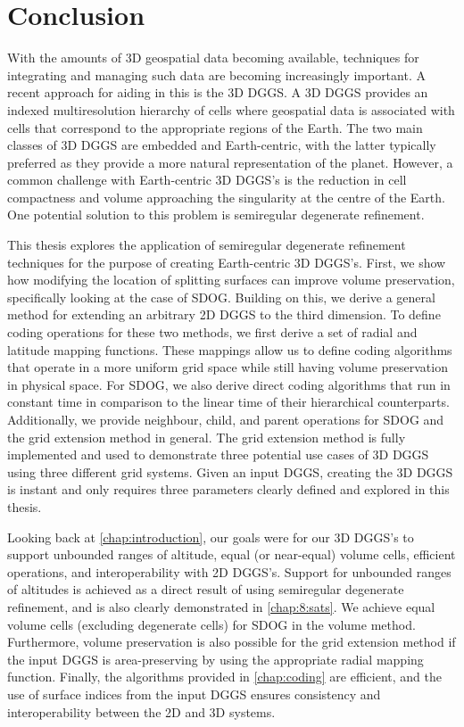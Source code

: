 \chapter{Conclusion} \label{chap:conclusion}
With the amounts of 3D geospatial data becoming available, techniques for integrating and managing such data are becoming increasingly important.
A recent approach for aiding in this is the 3D DGGS.
A 3D DGGS provides an indexed multiresolution hierarchy of cells where geospatial data is associated with cells that correspond to the appropriate regions of the Earth.
The two main classes of 3D DGGS are embedded and Earth-centric, with the latter typically preferred as they provide a more natural representation of the planet.
However, a common challenge with Earth-centric 3D DGGS's is the reduction in cell compactness and volume approaching the singularity at the centre of the Earth.
One potential solution to this problem is semiregular degenerate refinement.


This thesis explores the application of semiregular degenerate refinement techniques for the purpose of creating Earth-centric 3D DGGS's.
First, we show how modifying the location of splitting surfaces can improve volume preservation, specifically looking at the case of SDOG.
Building on this, we derive a general method for extending an arbitrary 2D DGGS to the third dimension.
To define coding operations for these two methods, we first derive a set of radial and latitude mapping functions.
These mappings allow us to define coding algorithms that operate in a more uniform grid space while still having volume preservation in physical space.
For SDOG, we also derive direct coding algorithms that run in constant time in comparison to the linear time of their hierarchical counterparts.
Additionally, we provide neighbour, child, and parent operations for SDOG and the grid extension method in general.
The grid extension method is fully implemented and used to demonstrate three potential use cases of 3D DGGS using three different grid systems.
Given an input DGGS, creating the 3D DGGS is instant and only requires three parameters clearly defined and explored in this thesis.


Looking back at \cref{chap:introduction}, our goals were for our 3D DGGS's to support unbounded ranges of altitude, equal (or near-equal) volume cells, efficient operations, and interoperability with 2D DGGS's.
Support for unbounded ranges of altitudes is achieved as a direct result of using semiregular degenerate refinement, and is also clearly demonstrated in \cref{chap:8:sats}.
We achieve equal volume cells (excluding degenerate cells) for SDOG in the volume method.
Furthermore, volume preservation is also possible for the grid extension method if the input DGGS is area-preserving by using the appropriate radial mapping function.
Finally, the algorithms provided in \cref{chap:coding} are efficient, and the use of surface indices from the input DGGS ensures consistency and interoperability between the 2D and 3D systems.


